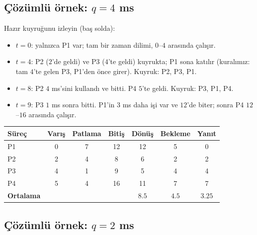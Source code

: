 \documentclass[11pt,a4paper]{article}
\begin{document}
\subsection{Çözümlü örnek: $q = 4$ ms}

\begin{center}
\end{center}

Hazır kuyruğunu izleyin (baş solda):
\begin{itemize}
  \item $t=0$: yalnızca P1 var; tam bir zaman dilimi, $0$--$4$ arasında çalışır.
  \item $t=4$: P2 ($2$'de geldi) ve P3 ($4$'te geldi) kuyrukta; P1 sona katılır (kuralımız: tam $4$'te gelen P3, P1'den önce girer). Kuyruk: P2, P3, P1.
  \item $t=8$: P2 $4$ ms'sini kullandı ve bitti. P4 $5$'te geldi. Kuyruk: P3, P1, P4.
  \item $t=9$: P3 $1$ ms sonra bitti. P1'in $3$ ms daha işi var ve $12$'de biter; sonra P4 $12$--$16$ arasında çalışır.
\end{itemize}

\begin{center}
\renewcommand{\arraystretch}{1.2}
\begin{tabular}{@{}lcccccc@{}}
\toprule
\textbf{Süreç} & \textbf{Varış} & \textbf{Patlama} & \textbf{Bitiş} & \textbf{Dönüş} & \textbf{Bekleme} & \textbf{Yanıt}\\
\midrule
P1 & 0 & 7 & 12 & 12 & 5 & 0\\
P2 & 2 & 4 & 8 & 6 & 2 & 2\\
P3 & 4 & 1 & 9 & 5 & 4 & 4\\
P4 & 5 & 4 & 16 & 11 & 7 & 7\\
\midrule
\textbf{Ortalama} & & & & $8.5$ & $4.5$ & $3.25$\\
\bottomrule
\end{tabular}
\end{center}

\subsection{Çözümlü örnek: $q = 2$ ms}

\begin{center}
\end{center}
\end{document}
